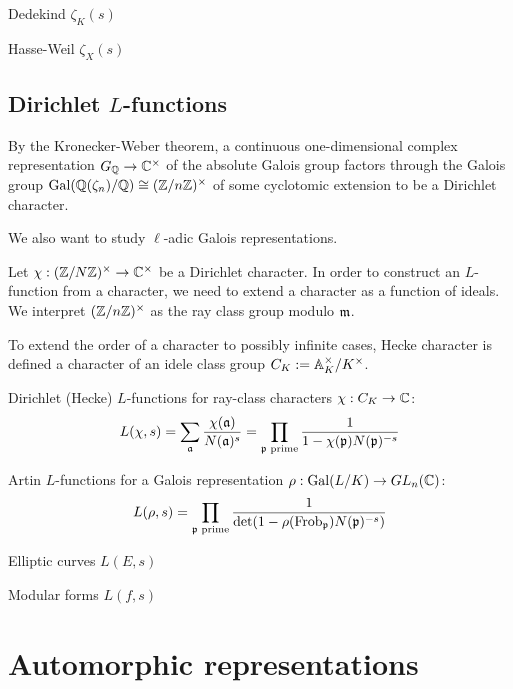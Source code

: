 \documentclass{../../large}
\newcommand{\Frob}{\mathrm{Frob}}
\begin{document}
Dedekind $\zeta_K(s)$

Hasse-Weil $\zeta_X(s)$

\section{Dirichlet $L$-functions}

By the Kronecker-Weber theorem, a continuous one-dimensional complex representation $G_{\mathbb{Q}}\to\mathbb{C}^\times$ of the absolute Galois group factors through the Galois group $\operatorname{Gal}(\mathbb{Q}(\zeta_n)/\mathbb{Q})\cong(\mathbb{Z}/n\mathbb{Z})^\times$ of some cyclotomic extension to be a Dirichlet character.

We also want to study $\ell$-adic Galois representations.


\begin{prb}
Let $\chi:(\mathbb{Z}/N\mathbb{Z})^\times\to\mathbb{C}^\times$ be a Dirichlet character.
In order to construct an $L$-function from a character, we need to extend a character as a function of ideals.
We interpret $(\mathbb{Z}/n\mathbb{Z})^\times$ as the ray class group modulo $\mathfrak{m}$.

To extend the order of a character to possibly infinite cases, Hecke character is defined a character of an idele class group $C_K:=\mathbb{A}_K^\times/K^\times$.
\end{prb}


Dirichlet (Hecke) $L$-functions for ray-class characters $\chi:C_K\to\mathbb{C}$:
\[L(\chi,s)=\sum_{\mathfrak{a}}\frac{\chi(\mathfrak{a})}{N(\mathfrak{a})^s}=\prod_{\mathfrak{p}\text{ prime}}\frac1{1-\chi(\mathfrak{p})N(\mathfrak{p})^{-s}}\]

Artin $L$-functions for a Galois representation $\rho:\operatorname{Gal}(L/K)\to GL_n(\mathbb{C})$:
\[L(\rho,s)=\prod_{\fp\text{ prime}}\frac1{\det(1-\rho(\Frob_\fp)N(\fp)^{-s})}\]

Elliptic curves $L(E,s)$

Modular forms $L(f,s)$


\chapter{Automorphic representations}
\end{document}
